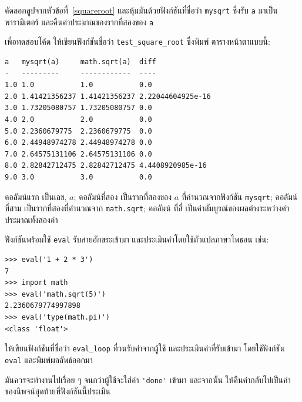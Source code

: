 \begin{exercise}

คัดลอกลูปจากหัวข้อที่~\ref{squareroot} และหุ้มมันด้วยฟังก์ชันที่ชื่อว่า \verb"mysqrt"
ซึ่งรับ {\tt a} มาเป็นพารามิเตอร์ และคืนค่าประมาณของรากที่สองของ {\tt a}

เพื่อทดสอบโค้ด ให้เขียนฟังก์ชันชื่อว่า \verb"test_square_root" ซึ่งพิมพ์
ตารางหน้าตาแบบนี้:

\begin{verbatim}
a   mysqrt(a)     math.sqrt(a)  diff
-   ---------     ------------  ----
1.0 1.0           1.0           0.0
2.0 1.41421356237 1.41421356237 2.22044604925e-16
3.0 1.73205080757 1.73205080757 0.0
4.0 2.0           2.0           0.0
5.0 2.2360679775  2.2360679775  0.0
6.0 2.44948974278 2.44948974278 0.0
7.0 2.64575131106 2.64575131106 0.0
8.0 2.82842712475 2.82842712475 4.4408920985e-16
9.0 3.0           3.0           0.0
\end{verbatim}
% 
คอลัมน์แรก เป็นเลข, $a$; คอลัมน์ที่สอง เป็นรากที่สองของ $a$ ที่คำนวณจากฟังก์ชัน
\verb"mysqrt"; คอลัมน์ที่สาม เป็นรากที่สองที่คำนวณจาก {\tt math.sqrt};  คอลัมน์
ที่สี่ เป็นค่าสัมบูรณ์ของผลต่างระหว่างค่าประมาณทั้งสองค่า
\end{exercise}


\begin{exercise}

ฟังก์ชันพร้อมใช้ {\tt eval} รับสายอักขระเข้ามา และประเมินค่าโดยใช้ตัวแปลภาษาไพธอน
เช่น:

\begin{verbatim}
>>> eval('1 + 2 * 3')
7
>>> import math
>>> eval('math.sqrt(5)')
2.2360679774997898
>>> eval('type(math.pi)')
<class 'float'>
\end{verbatim}
%
ให้เขียนฟังก์ชันที่ชื่อว่า \verb"eval_loop" ที่วนรับค่าจากผู้ใช้ และประเมินค่าที่รับเข้ามา
โดยใช้ฟังก์ชัน {\tt eval} และพิมพ์ผลลัพธ์ออกมา

มันควรจะทำงานไปเรื่อย ๆ จนกว่าผู้ใช้จะใส่ค่า \verb"'done'" เข้ามา และจากนั้น
ให้คืนค่ากลับไปเป็นค่าของนิพจน์สุดท้ายที่ฟังก์ชันนี้ประเมิน

\end{exercise}


